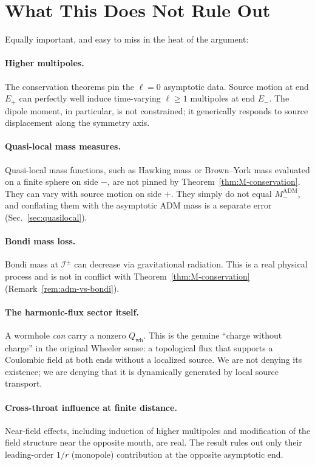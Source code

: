 \documentclass[aps,prd,onecolumn,nofootinbib,superscriptaddress]{revtex4-2}
\begin{document}
\section{What This Does Not Rule Out}
\label{sec:not-ruled-out}

Equally important, and easy to miss in the heat of the argument:

\paragraph*{Higher multipoles.} The conservation theorems pin the $\ell=0$ asymptotic data. Source motion at end $E_+$ can perfectly well induce time-varying $\ell\ge 1$ multipoles at end $E_-$. The dipole moment, in particular, is not constrained; it generically responds to source displacement along the symmetry axis.

\paragraph*{Quasi-local mass measures.} Quasi-local mass functions, such as Hawking mass or Brown--York mass evaluated on a finite sphere on side $-$, are not pinned by Theorem~\ref{thm:M-conservation}. They can vary with source motion on side $+$. They simply do not equal $M_-^{\mathrm{ADM}}$, and conflating them with the asymptotic ADM mass is a separate error (Sec.~\ref{sec:quasilocal}).

\paragraph*{Bondi mass loss.} Bondi mass at $\mathcal{I}^\pm$ can decrease via gravitational radiation. This is a real physical process and is not in conflict with Theorem~\ref{thm:M-conservation} (Remark~\ref{rem:adm-vs-bondi}).

\paragraph*{The harmonic-flux sector itself.} A wormhole \emph{can} carry a nonzero $Q_{\mathrm{wh}}$. This is the genuine ``charge without charge'' in the original Wheeler sense: a topological flux that supports a Coulombic field at both ends without a localized source. We are not denying its existence; we are denying that it is dynamically generated by local source transport.

\paragraph*{Cross-throat influence at finite distance.} Near-field effects, including induction of higher multipoles and modification of the field structure near the opposite mouth, are real. The result rules out only their leading-order $1/r$ (monopole) contribution at the opposite asymptotic end.
\end{document}
